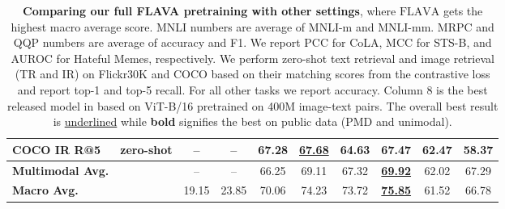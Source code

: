 \documentclass[10pt,twocolumn,letterpaper]{article}
\begin{document}
\begin{table*}[t]
\begin{tabular}{l@{\ }c|ccccccc|c}
COCO \cite{coco} IR R@5 & zero-shot & -- & -- & 67.28 & \underline{\textbf{67.68}} & 64.63 & 67.47 & 62.47 & 58.37 \\
\midrule
\textbf{Multimodal Avg.} &  & -- & -- & 66.25 & 69.11 & 67.32 & \underline{\textbf{69.92}} & 62.02 & 67.29 \\
\midrule
\textbf{Macro Avg.} &  & 19.15 & 23.85 & 70.06 & 74.23 & 73.72 & \underline{\textbf{75.85}} & 61.52 & 66.78 \\
\bottomrule
\end{tabular}
\vspace{-.5em}
\caption{\textbf{Comparing our full FLAVA pretraining with other settings}, where $\mathrm{FLAVA}$ gets the highest macro average score. MNLI numbers are average of MNLI-m and MNLI-mm. MRPC and QQP numbers are average of accuracy and F1. We report PCC for CoLA, MCC for STS-B, and AUROC for Hateful Memes, respectively. We perform zero-shot text retrieval and image retrieval (TR and IR) on Flickr30K and COCO based on their matching scores from the contrastive loss and report top-1 and top-5 recall. For all other tasks we report accuracy. Column 8 is the best released model in \cite{radford2021learning} based on ViT-B/16 pretrained on 400M image-text pairs. The overall best result is \underline{underlined} while \textbf{bold} signifies the best on public data (PMD and unimodal).}
\label{tab:ablations}
\vspace{-1em}
\end{table*}
\end{document}
